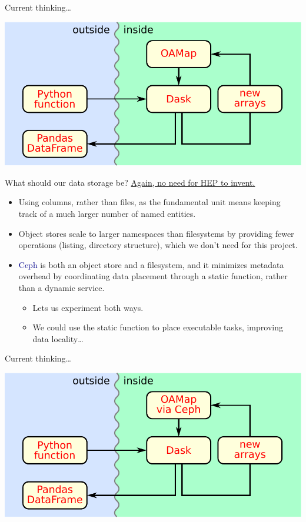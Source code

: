 \documentclass[aspectratio=169]{beamer}
\begin{document}
\begin{frame}{Current thinking\ldots}
\vspace{0.5 cm}
\begin{center}
\includegraphics[width=0.7\linewidth]{block-diagram-processing.pdf}
\end{center}
\end{frame}

\begin{frame}{What should our data storage be?}
\vspace{0.5 cm}
\underline{Again, no need for HEP to invent.}

\vspace{0.25 cm}
\begin{itemize}\setlength{\itemsep}{0.25 cm}
\item<2-> Using columns, rather than files, as the fundamental unit means keeping track of a much larger number of named entities.

\item<3-> Object stores scale to larger namespaces than filesystems by providing fewer operations (listing, directory structure), which we don't need for this project.

\item<4-> \textcolor{darkblue}{Ceph} is both an object store and a filesystem, and it minimizes metadata overhead by coordinating data placement through a static function, rather than a dynamic service.

\begin{itemize}
\item<5-> Lets us experiment both ways.

\item<5-> We could use the static function to place executable tasks, improving data locality\ldots
\end{itemize}
\end{itemize}
\end{frame}

\begin{frame}{Current thinking\ldots}
\vspace{0.5 cm}
\begin{center}
\includegraphics[width=0.7\linewidth]{block-diagram-ceph.pdf}
\end{center}
\end{frame}
\end{document}
